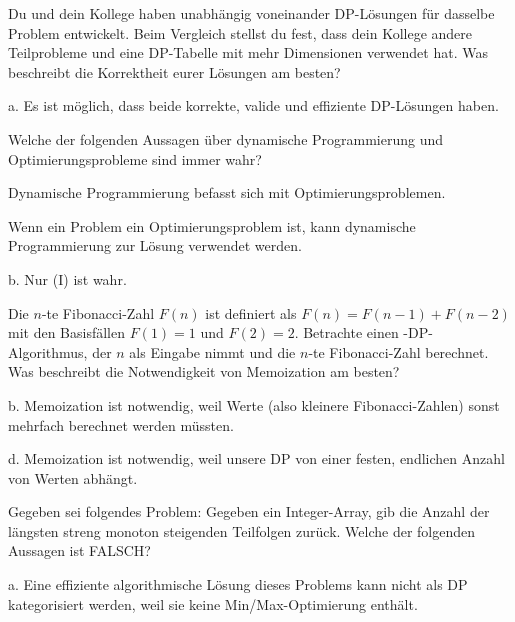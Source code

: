 \begin{contentbox}
Du und dein Kollege haben unabhängig voneinander DP-Lösungen für dasselbe Problem entwickelt. Beim Vergleich stellst du fest, dass dein Kollege andere Teilprobleme und eine DP-Tabelle mit mehr Dimensionen verwendet hat. Was beschreibt die Korrektheit eurer Lösungen am besten?
\begin{factlist}
    \item a. Es ist möglich, dass beide korrekte, valide und effiziente DP-Lösungen haben.
\end{factlist}
\end{contentbox}


\begin{contentbox}
Welche der folgenden Aussagen über dynamische Programmierung und Optimierungsprobleme sind immer wahr?
\begin{factlist}
    \item[(I)] Dynamische Programmierung befasst sich mit Optimierungsproblemen.
    \item[(II)] Wenn ein Problem ein Optimierungsproblem ist, kann dynamische Programmierung zur Lösung verwendet werden.
    \item b. Nur (I) ist wahr.
\end{factlist}
\end{contentbox}


\begin{contentbox}
Die $n$-te Fibonacci-Zahl $F(n)$ ist definiert als $F(n) = F(n-1) + F(n-2)$ mit den Basisfällen $F(1) = 1$ und $F(2) = 2$. Betrachte einen -DP-Algorithmus, der $n$ als Eingabe nimmt und die $n$-te Fibonacci-Zahl berechnet. Was beschreibt die Notwendigkeit von Memoization am besten?
\begin{factlist}
    \item b. Memoization ist notwendig, weil Werte (also kleinere Fibonacci-Zahlen) sonst mehrfach berechnet werden müssten.
    \item d. Memoization ist notwendig, weil unsere DP von einer festen, endlichen Anzahl von Werten abhängt.
\end{factlist}
\end{contentbox}


\begin{contentbox}
Gegeben sei folgendes Problem: Gegeben ein Integer-Array, gib die Anzahl der längsten streng monoton steigenden Teilfolgen zurück. Welche der folgenden Aussagen ist FALSCH?
\begin{factlist}
    \item a. Eine effiziente algorithmische Lösung dieses Problems kann nicht als DP kategorisiert werden, weil sie keine Min/Max-Optimierung enthält.
\end{factlist}
\end{contentbox}




